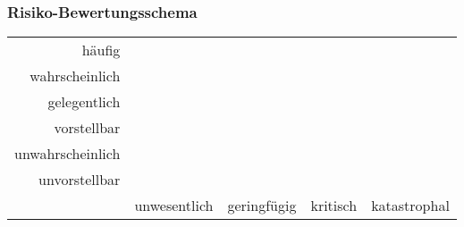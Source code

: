 \subsubsection{Risiko-Bewertungsschema}
\begin{table}[h!]
	\renewcommand{\arraystretch}{1.5}
	\centering
	\begin{tabular}{r || c c c c}
		häufig 		
			& \cellcolor{red} 
			& \cellcolor{red}
			& \cellcolor{red}
			& \cellcolor{red} \\
		wahrscheinlich		
			& \cellcolor{yellow} 
			& \cellcolor{yellow} 
			& \cellcolor{red}
			& \cellcolor{red} \\
		gelegentlich		
			& \cellcolor{yellow}
			& \cellcolor{yellow}
			& \cellcolor{yellow}
			& \cellcolor{red} \\
		vorstellbar		
			& \cellcolor{green}
			& \cellcolor{yellow}
			& \cellcolor{yellow}
			& \cellcolor{yellow} \\
		unwahrscheinlich	
			& \cellcolor{green}
			& \cellcolor{green}
			& \cellcolor{yellow}
			& \cellcolor{yellow} \\
		unvorstellbar		
			& \cellcolor{green}
			& \cellcolor{green}
			& \cellcolor{green}
			& \cellcolor{green} \\
		\hline
		& unwesentlich & geringfügig & kritisch & katastrophal
	\end{tabular}
\end{table}

